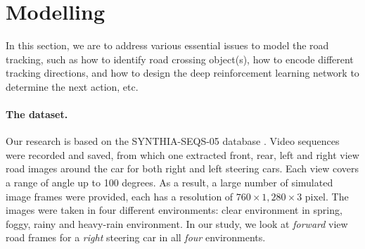 \documentclass{svproc}
\begin{document}
 


\section{Modelling}
In this section, we are to address various essential issues to model the road tracking, such as how to identify road crossing object(s), how to encode different tracking directions, and how to design the deep reinforcement learning network to determine the next action, etc. 


\paragraph{The dataset.} Our research is based on the SYNTHIA-SEQS-05 database \cite{Ros2016TheSYNTHIA}. Video sequences were recorded and saved, from which one extracted front, rear, left and right view road images around the car for both right and left steering cars. Each view covers a range of angle up to 100 degrees. As a result, a large number of simulated image frames were provided, each has a resolution of $760 \times 1,280 \times 3$ pixel. The images were taken in four different environments: clear environment in spring, foggy, rainy and heavy-rain  environment. In our study, we look at \emph{forward} view road frames for a \emph{right} steering car in all \emph{four} environments. 
\end{document}
